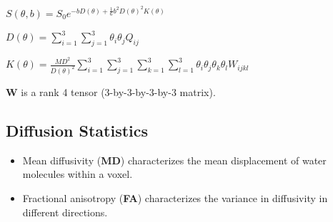 \documentclass[a0, landscape]{a0poster}
\begin{document}
\begin{multicols}{3}
\vspace{2mm}
\begin{center}
\begin{large}

$ S(\theta, b)=S_{0}e^{-bD(\theta)+\frac{1}{6}b^{2}D(\theta)^{2}K(\theta)}$

\vspace{2mm}
\end{large}
\end{center}

\vspace{2mm}
\begin{center}
\begin{large}

$D(\theta)=\sum_{i=1}^{3}\sum_{j=1}^{3}\theta_{i}\theta_{j}Q_{ij}$

\vspace{2mm}
\end{large}
\end{center}

\vspace{2mm}
\begin{center}
\begin{large}

$K(\theta)=\frac{MD^{2}}{D(\theta)^{2}}\sum_{i=1}^{3}\sum_{j=1}^{3}\sum_{k=1}^{3} \sum_{l=1}^{3}\theta_{i}\theta_{j}\theta_{k}\theta_{l}W_{ijkl}$

\vspace{2mm}
\end{large}
\end{center}

$\mathbf{W}$ is a rank 4 tensor (3-by-3-by-3-by-3 matrix).

\vspace{-2mm}
\subsection*{Diffusion Statistics}

\begin{itemize}

\item Mean diffusivity (\textbf{MD}) characterizes the mean displacement of
water molecules within a voxel.

\item Fractional anisotropy (\textbf{FA}) characterizes the variance in
diffusivity in different directions.

\end{itemize}

\large


\end{multicols}
\end{document}
